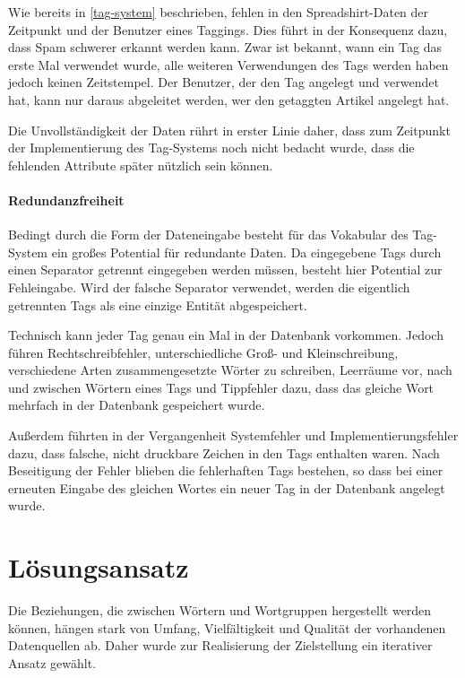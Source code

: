 Wie bereits in \ref{tag-system} beschrieben, fehlen in den Spreadshirt-Daten der Zeitpunkt und der Benutzer eines Taggings. Dies führt in der Konsequenz dazu, dass Spam schwerer erkannt werden kann. Zwar ist bekannt, wann ein Tag das erste Mal verwendet wurde, alle weiteren Verwendungen des Tags werden haben jedoch keinen Zeitstempel. Der Benutzer, der den Tag angelegt und verwendet hat, kann nur daraus abgeleitet werden, wer den getaggten Artikel angelegt hat.

Die Unvollständigkeit der Daten rührt in erster Linie daher, dass zum Zeitpunkt der Implementierung des Tag-Systems noch nicht bedacht wurde, dass die fehlenden Attribute später nützlich sein können.

\paragraph{Redundanzfreiheit}

Bedingt durch die Form der Dateneingabe besteht für das Vokabular des Tag-System ein großes Potential für redundante Daten. Da eingegebene Tags durch einen Separator getrennt eingegeben werden müssen, besteht hier Potential zur Fehleingabe. Wird der falsche Separator verwendet, werden die eigentlich getrennten Tags als eine einzige Entität abgespeichert.

Technisch kann jeder Tag genau ein Mal in der Datenbank vorkommen. Jedoch führen Rechtschreibfehler, unterschiedliche Groß- und Kleinschreibung, verschiedene Arten zusammengesetzte Wörter zu schreiben, Leerräume vor, nach und zwischen Wörtern eines Tags und Tippfehler dazu, dass das gleiche Wort mehrfach in der Datenbank gespeichert wurde.

Außerdem führten in der Vergangenheit Systemfehler und Implementierungsfehler dazu, dass falsche, nicht druckbare Zeichen in den Tags enthalten waren. Nach Beseitigung der Fehler blieben die fehlerhaften Tags bestehen, so dass bei einer erneuten Eingabe des gleichen Wortes ein neuer Tag in der Datenbank angelegt wurde.

\section{Lösungsansatz}

Die Beziehungen, die zwischen Wörtern und Wortgruppen hergestellt werden können, hängen stark von Umfang, Vielfältigkeit und Qualität der vorhandenen Datenquellen ab. Daher wurde zur Realisierung der Zielstellung ein iterativer Ansatz gewählt.

